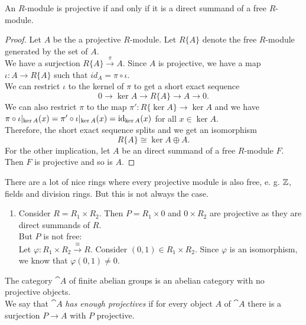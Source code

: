 \begin{proposition}
	An $R$-module is projective if and only if it is a direct summand of a free $R$-module.
\end{proposition}

\begin{proof}
	Let $A$ be the a projective $R$-module. Let $R\{A\}$ denote the free $R$-module generated by the set of $A$. \\
	We have a surjection $R\{A\}\overset{\pi}{\longrightarrow}A$. Since $A$ is projective, we have a map $\iota:A\rightarrow R\{A\}$ such that $id_A=\pi\circ\iota$. \\
	We can restrict $\iota$ to the kernel of $\pi$ to get a short exact sequence
	$$0\rightarrow \ker A \rightarrow R\{A\} \rightarrow A \rightarrow 0.$$
	We can also restrict $\pi$ to the map $\pi':R\{\ker A\}\rightarrow \ker A$ and we have $\pi\circ\iota\vert_{\ker A}(x) = \pi'\circ\iota\vert_{\ker A}(x) = \operatorname{id}_{\ker A}(x)$ for all $x\in\ker A$. \\
	Therefore, the short exact sequence splits and we get an isomorphism $$R\{A\}\cong \ker A \oplus A.$$
	For the other implication, let $A$ be an direct summand of a free $R$-module $F$. Then $F$ is projective and so is $A$. 
\end{proof}

\begin{example}
	There are a lot of nice rings where every projective module is also free, e. g. ${\mathbb Z}$, fields and division rings.
	But this is not always the case.
	\begin{enumerate}[label=(\roman*)]
		\item Consider $R=R_1\times R_2$. Then $P=R_1\times 0$ and $0\times R_2$ are projective as they are direct summands of $R$. \\
		But $P$ is not free: \\
		Let $\varphi:R_1\times R_2 \overset{\cong}{\longrightarrow} R$. Consider $(0,1)\in R_1\times R_2$.
		Since $\varphi$ is an isomorphism, we know that $\varphi(0,1)\neq0$.
	\end{enumerate}
\end{example}

\begin{remark}
	The category $\cat{A}$ of finite abelian groups is an abelian category with no projective objects. \\
	We say that $\cat{A}$ \textit{has enough projectives} if for every object $A$ of $\cat{A}$ there is a surjection $P\rightarrow A$ with $P$ projective.
\end{remark}

